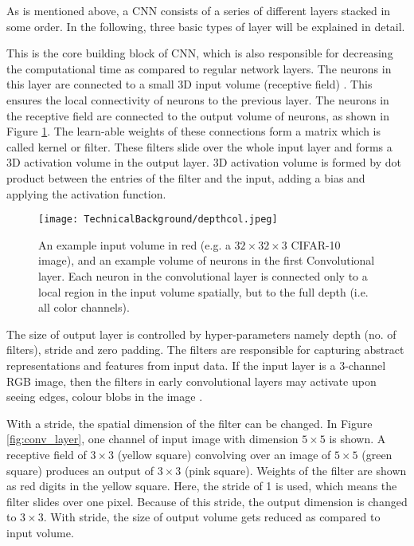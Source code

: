 As is mentioned above, a CNN consists of a series of different layers stacked in some order. In the following, three basic types of layer will be explained in detail.

\begin{description}[leftmargin=0in, labelindent=0pt]
\item[Convolutional Layer]  {This is the core building block of CNN, which is also responsible for decreasing the computational time as compared to regular network layers. The neurons in this layer are connected to a small 3D input volume (receptive field) \cite{cnnlecture2017}. This ensures the local connectivity of neurons to the previous layer. The neurons in the receptive field are connected to the output volume of neurons, as shown in Figure \ref{fig:cnn_layer_input}. The learn-able weights of these connections form a matrix which is called kernel or filter. These filters slide over the whole input layer and forms a 3D activation volume in the output layer. 3D activation volume is formed by dot product between the entries of the filter and the input, adding a bias and applying the activation function.

\begin{figure}[h!]
  \centering
  \texttt{[image: TechnicalBackground/depthcol.jpeg]}
  \caption{An example input volume in red (e.g. a $32 \times 32 \times 3$ CIFAR-10 image), and an example volume of neurons in the first Convolutional layer. Each neuron in the convolutional layer is connected only to a local region in the input volume spatially, but to the full depth (i.e. all color channels). \cite{cnnlecture2017}}
  \label{fig:cnn_layer_input}
\end{figure}

The size of output layer is controlled by hyper-parameters namely depth (no. of filters), stride and zero padding. The filters are responsible for capturing abstract representations and features from input data. If the input layer is a 3-channel RGB image, then the filters in early convolutional layers may activate upon seeing edges, colour blobs in the image \cite{cnnlecture2017}. 

With a stride, the spatial dimension of the filter can be changed. In Figure \ref{fig:conv_layer}, one channel of input image with dimension $5 \times 5$ is shown. A receptive field of $3 \times 3$ (yellow square) convolving over an image of $5 \times 5$ (green square) produces an output of $3 \times 3$ (pink square). Weights of the filter are shown as red digits in the yellow square. Here, the stride of 1 is used, which means the filter slides over one pixel. Because of this stride, the output dimension is changed to $3 \times 3$. With stride, the size of output volume gets reduced as compared to input volume. 

}
\end{description}
